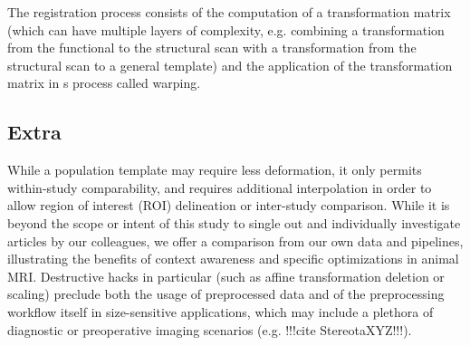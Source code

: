The registration process consists of the computation of a transformation matrix (which can have multiple layers of complexity, e.g. combining a transformation from the functional to the structural scan with a transformation from the structural scan to a general template) and the application of the transformation matrix in s process called warping.

	\subsection{Extra}
	While a population template may require less deformation, it only permits within-study comparability, and requires additional interpolation in order to allow region of interest (ROI) delineation or inter-study comparison.
	While it is beyond the scope or intent of this study to single out and individually investigate articles by our colleagues, we offer a comparison from our own data and pipelines, illustrating the benefits of context awareness and specific optimizations in animal MRI.
	Destructive hacks in particular (such as affine transformation deletion or scaling) preclude both the usage of preprocessed data and of the preprocessing workflow itself in size-sensitive applications, which may include a plethora of diagnostic or preoperative imaging scenarios (e.g. !!!cite StereotaXYZ!!!).
